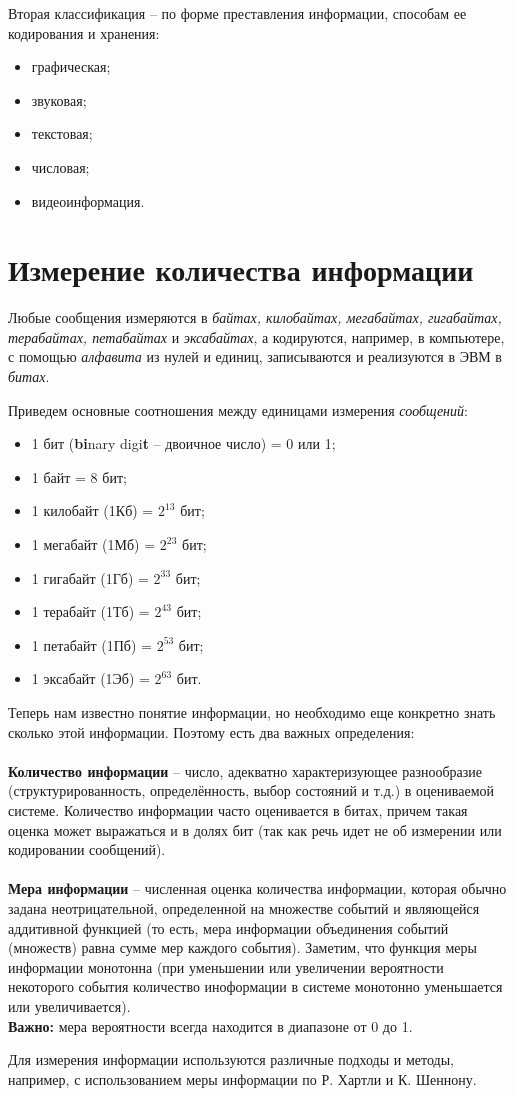 Вторая классификация -- по форме преставления информации, способам ее кодирования и хранения:
\begin{itemize}
  \item графическая;
  \item звуковая;
  \item текстовая;
  \item числовая;
  \item видеоинформация.
\end{itemize}

\section{Измерение количества информации}
Любые сообщения измеряются в \emph{байтах, килобайтах, мегабайтах, гигабайтах, терабайтах, петабайтах} и \emph{эксабайтах}, а кодируются, например, в компьютере, с помощью \emph{алфавита} из нулей и единиц, записываются и реализуются в ЭВМ в \emph{битах}.

Приведем основные соотношения между единицами измерения \emph{сообщений}:
\begin{itemize}
\item 1 бит (\textbf{bi}nary digi\textbf{t} -- двоичное число) = 0 или 1;
\item 1 байт = 8 бит;
\item 1 килобайт (1Кб) = $2^{13}$ бит;
\item 1 мегабайт (1Мб) = $2^{23}$ бит;
\item 1 гигабайт (1Гб) = $2^{33}$ бит;
\item 1 терабайт (1Тб) = $2^{43}$ бит;
\item 1 петабайт (1Пб) = $2^{53}$ бит;
\item 1 эксабайт (1Эб) = $2^{63}$ бит.
\end{itemize}

Теперь нам известно понятие информации, но необходимо еще конкретно знать сколько этой информации. Поэтому есть два важных определения:
\\
\\\textbf{Количество информации} -- число, адекватно характеризующее разнообразие (структурированность, определённость, выбор состояний и т.д.) в оцениваемой системе. Количество информации часто оценивается в битах, причем такая оценка может выражаться и в долях бит (так как речь идет не об измерении или кодировании сообщений).
\\
\\\textbf{Мера информации} -- численная оценка количества информации, которая обычно задана неотрицательной, определенной на множестве событий и являющейся аддитивной функцией (то есть, мера информации объединения событий (множеств) равна сумме мер каждого события). Заметим, что функция меры информации монотонна (при уменьшении или увеличении вероятности некоторого события количество иноформации в системе монотонно уменьшается или увеличивается). 
\\\textbf{Важно:} мера вероятности всегда находится в диапазоне от 0 до 1.
\par
Для измерения информации используются различные подходы и методы, например, с использованием меры информации по Р. Хартли и К. Шеннону.

